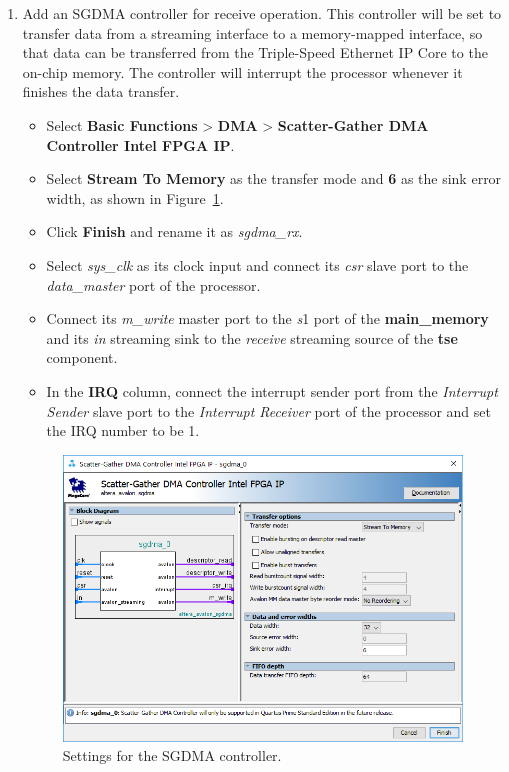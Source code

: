 \documentclass[11pt, twoside, pdftex]{article}
\begin{document}
\begin{enumerate}
	\item Add an SGDMA controller for receive operation. This controller will be set to transfer data from a streaming interface to a memory-mapped interface, so that data can be transferred from the Triple-Speed Ethernet IP Core to the on-chip memory. The controller will interrupt the processor whenever it finishes the data transfer. 
		\begin{itemize}
			\item Select {\bf Basic Functions} > {\bf DMA} > {\bf Scatter-Gather DMA Controller Intel FPGA IP}. 
			\item Select {\bf Stream To Memory} as the transfer mode and {\bf 6} as the sink error width, as shown in Figure~\ref{fig:sgdma_settings1}.  
			\item Click {\bf Finish} and rename it as {\it sgdma\_rx}.
			\item Select {\it sys\_clk} as its clock input and connect its {\it csr} slave port to the {\it data\_master} port of the processor.
			\item Connect its {\it m\_write} master port to the {\it s}1 port of the {\bf main\_memory} and its {\it in} streaming sink to the {\it receive} streaming source of the {\bf tse} component.		
			\item In the {\bf IRQ} column, connect the interrupt sender port from the {\it Interrupt Sender} slave port to the {\it Interrupt Receiver} port of the processor and set the IRQ number to be 1.
		\end{itemize}
		
		\begin{figure}[H]
			\centering
			  \includegraphics[scale=0.65]{figures/sgdma_settings1.png}
			\caption{Settings for the SGDMA controller.} 
			\label{fig:sgdma_settings1}
		\end{figure}		
	

\end{enumerate}
\end{document}
